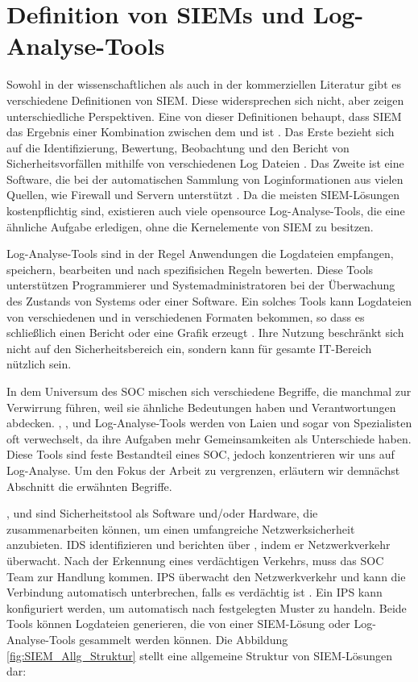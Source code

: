 \section{Definition von SIEMs und Log-Analyse-Tools}

Sowohl in der wissenschaftlichen als auch in der kommerziellen Literatur gibt es verschiedene Definitionen von \gls{SIEM}. Diese widersprechen sich nicht, aber zeigen unterschiedliche Perspektiven. Eine von dieser Definitionen behaupt, dass \gls{SIEM} das Ergebnis einer Kombination zwischen dem  und  ist \citep{Dorigo_SIEM}. Das Erste bezieht sich auf die Identifizierung, Bewertung, Beobachtung und den Bericht von Sicherheitsvorfällen mithilfe von verschiedenen Log Dateien \citep{techopedia_SEM}. Das Zweite ist eine Software, die bei der automatischen Sammlung von Loginformationen aus vielen Quellen, wie Firewall und Servern unterstützt \citep{techopedia_SIM}. Da die meisten \gls{SIEM}-Lösungen kostenpflichtig sind, existieren auch viele \gls{opensource} Log-Analyse-Tools, die eine ähnliche Aufgabe erledigen, ohne die Kernelemente von \gls{SIEM} zu besitzen.

Log-Analyse-Tools sind in der Regel Anwendungen die Logdateien empfangen, speichern, bearbeiten und nach spezifisichen Regeln bewerten. Diese Tools unterstützen Programmierer und Systemadministratoren bei der Überwachung des Zustands von Systems oder einer Software. Ein solches Tools kann Logdateien von verschiedenen  und in verschiedenen Formaten bekommen, so dass es schließlich einen Bericht oder eine Grafik erzeugt \citep{Korzeniowski_LATDef}. Ihre Nutzung beschränkt sich nicht auf den Sicherheitsbereich ein, sondern kann für gesamte IT-Bereich nützlich sein.

In dem Universum des \gls{SOC} mischen sich verschiedene Begriffe, die manchmal zur Verwirrung führen, weil sie ähnliche Bedeutungen haben und Verantwortungen abdecken. , ,  und Log-Analyse-Tools werden von Laien und sogar von Spezialisten oft verwechselt, da ihre Aufgaben mehr Gemeinsamkeiten als Unterschiede haben. Diese Tools sind feste Bestandteil eines \gls{SOC}, jedoch konzentrieren wir uns auf Log-Analyse. Um den Fokus der Arbeit zu vergrenzen, erläutern wir demnächst Abschnitt die erwähnten Begriffe.

,  und  sind Sicherheitstool als Software und/oder Hardware, die zusammenarbeiten können, um einen umfangreiche Netzwerksicherheit anzubieten. \gls{IDS} identifizieren und berichten über , indem er Netzwerkverkehr überwacht. Nach der Erkennung eines verdächtigen Verkehrs, muss das \gls{SOC} Team zur Handlung kommen. \gls{IPS} überwacht den Netzwerkverkehr und kann die Verbindung automatisch unterbrechen, falls es verdächtig ist \citep{Wendzel_IS}. Ein \gls{IPS} kann konfiguriert werden, um automatisch nach festgelegten Muster zu handeln. Beide Tools können Logdateien generieren, die von einer \gls{SIEM}-Lösung oder Log-Analyse-Tools gesammelt werden können. Die Abbildung \ref{fig:SIEM_Allg_Struktur} stellt eine allgemeine Struktur von \gls{SIEM}-Lösungen dar:

